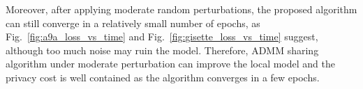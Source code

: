 Moreover, after applying moderate random perturbations, the proposed algorithm can still converge in a relatively small number of epochs, as Fig.~\ref{fig:a9a_loss_vs_time} and Fig.~\ref{fig:gisette_loss_vs_time} suggest, although too much noise may ruin the model.
Therefore, ADMM sharing algorithm under moderate perturbation can improve the local model and the privacy cost is well contained as the algorithm converges in a few epochs.



